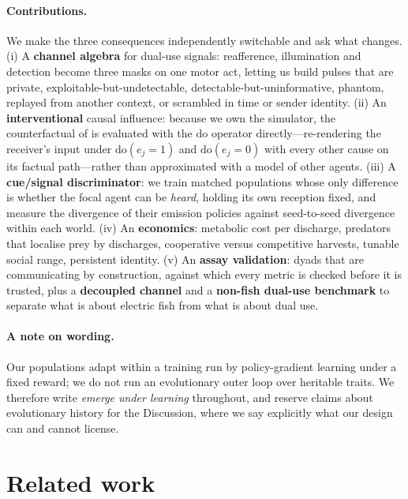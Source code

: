 \documentclass[10pt,twoside]{article}
\newcommand{\dosim}{\mathrm{do}}
\begin{document}
\paragraph{Contributions.} We make the three consequences independently
switchable and ask what changes. (i) A \textbf{channel algebra} for dual-use
signals: reafference, illumination and detection become three masks on one motor
act, letting us build pulses that are private, exploitable-but-undetectable,
detectable-but-uninformative, phantom, replayed from another context, or scrambled
in time or sender identity. (ii) An \textbf{interventional} causal influence:
because we own the simulator, the counterfactual of \citet{jaques2019social} is
evaluated with the $\dosim$ operator directly---re-rendering the receiver's input
under $\dosim(e_j{=}1)$ and $\dosim(e_j{=}0)$ with every other cause on its
factual path---rather than approximated with a model of other agents. (iii) A
\textbf{cue/signal discriminator}: we train matched populations whose only
difference is whether the focal agent can be \emph{heard}, holding its own
reception fixed, and measure the divergence of their emission policies against
seed-to-seed divergence within each world. (iv) An \textbf{economics}: metabolic
cost per discharge, predators that localise prey by discharges, cooperative versus
competitive harvests, tunable social range, persistent identity. (v) An
\textbf{assay validation}: dyads that are communicating by construction, against
which every metric is checked before it is trusted, plus a \textbf{decoupled
channel} and a \textbf{non-fish dual-use benchmark} to separate what is about
electric fish from what is about dual use.

\paragraph{A note on wording.} Our populations adapt within a training run by
policy-gradient learning under a fixed reward; we do not run an evolutionary
outer loop over heritable traits. We therefore write \emph{emerge under learning}
throughout, and reserve claims about evolutionary history for the Discussion,
where we say explicitly what our design can and cannot license.


\section{Related work}
\end{document}
